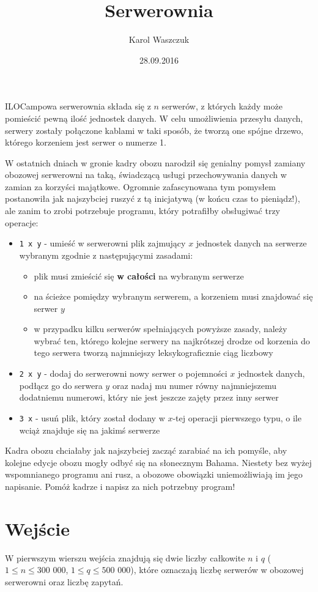 \documentclass[zad,zawodnik,utf8]{sinol}
\title{Serwerownia}
\author{Karol Waszczuk} %
\date{28.09.2016}
\begin{document}
\begin{tasktext}%

ILOCampowa serwerownia składa się z $n$ serwerów, z których każdy może pomieścić pewną ilość jednostek danych. W celu umożliwienia przesyłu danych, serwery zostały połączone kablami w taki sposób, że tworzą one spójne drzewo, którego korzeniem jest serwer o numerze 1.

W ostatnich dniach w gronie kadry obozu narodził się genialny pomysł zamiany obozowej serwerowni na taką, świadczącą usługi przechowywania danych w zamian za korzyści majątkowe. Ogromnie zafascynowana tym pomysłem postanowiła jak najszybciej ruszyć z tą inicjatywą (w końcu czas to pieniądz!), ale zanim to zrobi potrzebuje programu, który potrafiłby obsługiwać trzy operacje:
\begin{itemize}
\item \texttt{1 x y} - umieść w serwerowni plik zajmujący $x$ jednostek danych na serwerze wybranym zgodnie z następującymi zasadami:
    \begin{itemize}
    \item plik musi zmieścić się \textbf{w całości} na wybranym serwerze
    \item na ścieżce pomiędzy wybranym serwerem, a korzeniem musi znajdować się serwer $y$
    \item w przypadku kilku serwerów spełniających powyższe zasady, należy wybrać ten, którego kolejne serwery na najkrótszej drodze od korzenia do tego serwera tworzą najmniejszy leksykograficznie ciąg liczbowy
    \end{itemize}
\item \texttt{2 x y} - dodaj do serwerowni nowy serwer o pojemności $x$ jednostek danych, podłącz go do serwera $y$ oraz nadaj mu numer równy najmniejszemu dodatniemu numerowi, który nie jest jeszcze zajęty przez inny serwer 
\item \texttt{3 x} - usuń plik, który został dodany w $x$-tej operacji pierwszego typu, o ile wciąż znajduje się na jakimś serwerze
\end{itemize}

Kadra obozu chciałaby jak najszybciej zacząć zarabiać na ich pomyśle, aby kolejne edycje obozu mogły odbyć się na słonecznym Bahama. Niestety bez wyżej wspomnianego programu ani rusz, a obozowe obowiązki uniemożliwiają im jego napisanie. Pomóż kadrze i napisz za nich potrzebny program!

  \section{Wejście}
W pierwszym wierszu wejścia znajdują się dwie liczby całkowite $n$ i $q$ ($1 \leq n \leq 300$ $000$, $1 \leq q \leq 500$ $000$), które oznaczają liczbę serwerów w obozowej serwerowni oraz liczbę zapytań.


\end{tasktext}
\end{document}
